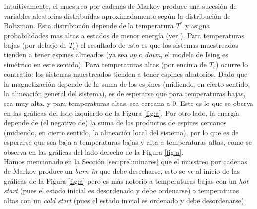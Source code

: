 \documentclass[a4paper,12pt]{article}
\begin{document}
Intuitivamente, el muestreo por cadenas de Markov produce una sucesión de variables aleatorias distribuídas aproximadamente según la distribución de Boltzman. Esta distribución depende de la temperatura $T^*$ y asigna probabilidades mas altas a estados de menor energía (ver \cite{phillies2000elementary}). Para temperaturas bajas (por debajo de $T_c$) el resultado de esto es que los sistemas muestreados tienden a tener espines alineados (ya sea {\it up} o {\it down}, el modelo de Ising es simétrico en este sentido). Para temperaturas altas (por encima de $T_c$) ocurre lo contratio: los sistemas muestreados tienden a tener espines aleatorios. Dado que la magnetización depende de la suma de los espines (midiendo, en cierto sentido, la alineación general del sistema), es de esperarse que para temperaturas bajas, sea muy alta, y para temperaturas altas, sea cercana a 0. Esto es lo que se oberva en las gráficas del lado izquierdo de la Figura \ref{fig:a}. Por otro lado, la energía depende de (el negativo de) la suma de los productos de espines cercanos (midiendo, en cierto sentido, la alineación local del sistema), por lo que es de esperarse que sea baja a temperaturas bajas y alta a temperaturas altas, como se observa en las gráficas del lado derecho de la Figura \ref{fig:a}.\\

Hamos mencionado en la Sección \ref{sec:preliminares} que el muestreo por cadenas de Markov produce un {\it burn in} que debe desecharse, esto se ve al inicio de las gráficas de la Figura \ref{fig:a} pero es más notorio a temperaturas bajas con un {\it hot start} (pues el estado inicial es desordenado y debe ordenarse) o temperaturas altas con un {\it cold start} (pues el estado inicial es ordenado y debe desordenarse).\\ %
\end{document}
